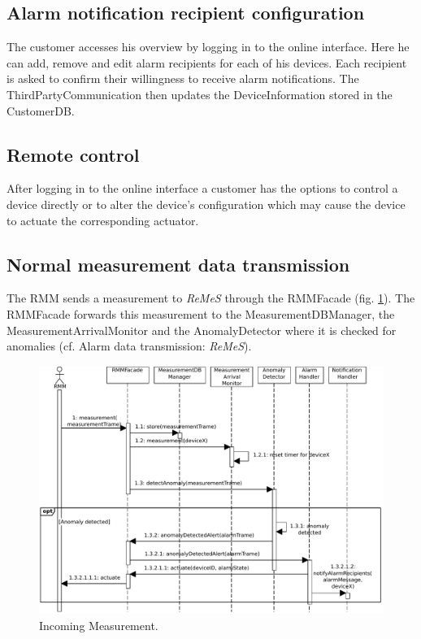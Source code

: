 \documentclass[a4paper,10pt]{article}
\newcommand{\rem}{\emph{ReMeS}\xspace}
\begin{document}
\subsection{Alarm notification recipient configuration}
The customer accesses his overview by logging in to the online interface. Here he can add, remove and edit alarm recipients for each of his devices. Each recipient is asked to confirm their willingness to receive alarm notifications. The ThirdPartyCommunication then updates the DeviceInformation stored in the CustomerDB.

\subsection{Remote control}
After logging in to the online interface a customer has the options to control a device directly or to alter the device's configuration which may cause the device to actuate the corresponding actuator.

\subsection{Normal measurement data transmission}
The RMM sends a measurement to \rem through the RMMFacade (fig. \ref{fig:seq_measurement}). The RMMFacade forwards this measurement to the MeasurementDBManager, the MeasurementArrivalMonitor and the AnomalyDetector where it is checked for anomalies (cf. Alarm data transmission: \rem).

\begin{figure}[!htp]
    \centering
    \includegraphics[width=\textwidth]{RMM Transmission}
    \caption{Incoming Measurement.}
    \label{fig:seq_measurement}
\end{figure}
\end{document}
